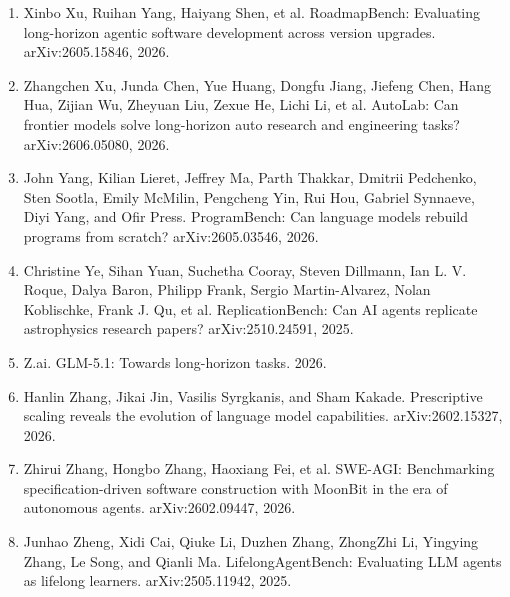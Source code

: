 \begin{enumerate}
\item Xinbo Xu, Ruihan Yang, Haiyang Shen, et al. RoadmapBench: Evaluating long-horizon agentic software development across version upgrades. arXiv:2605.15846, 2026.

\item Zhangchen Xu, Junda Chen, Yue Huang, Dongfu Jiang, Jiefeng Chen, Hang Hua, Zijian Wu, Zheyuan Liu, Zexue He, Lichi Li, et al. AutoLab: Can frontier models solve long-horizon auto research and engineering tasks? arXiv:2606.05080, 2026.

\item John Yang, Kilian Lieret, Jeffrey Ma, Parth Thakkar, Dmitrii Pedchenko, Sten Sootla, Emily McMilin, Pengcheng Yin, Rui Hou, Gabriel Synnaeve, Diyi Yang, and Ofir Press. ProgramBench: Can language models rebuild programs from scratch? arXiv:2605.03546, 2026.

\item Christine Ye, Sihan Yuan, Suchetha Cooray, Steven Dillmann, Ian L. V. Roque, Dalya Baron, Philipp Frank, Sergio Martin-Alvarez, Nolan Koblischke, Frank J. Qu, et al. ReplicationBench: Can AI agents replicate astrophysics research papers? arXiv:2510.24591, 2025.

\item Z.ai. GLM-5.1: Towards long-horizon tasks. 2026.

\item Hanlin Zhang, Jikai Jin, Vasilis Syrgkanis, and Sham Kakade. Prescriptive scaling reveals the evolution of language model capabilities. arXiv:2602.15327, 2026.

\item Zhirui Zhang, Hongbo Zhang, Haoxiang Fei, et al. SWE-AGI: Benchmarking specification-driven software construction with MoonBit in the era of autonomous agents. arXiv:2602.09447, 2026.

\item Junhao Zheng, Xidi Cai, Qiuke Li, Duzhen Zhang, ZhongZhi Li, Yingying Zhang, Le Song, and Qianli Ma. LifelongAgentBench: Evaluating LLM agents as lifelong learners. arXiv:2505.11942, 2025.

\end{enumerate}
\endgroup
